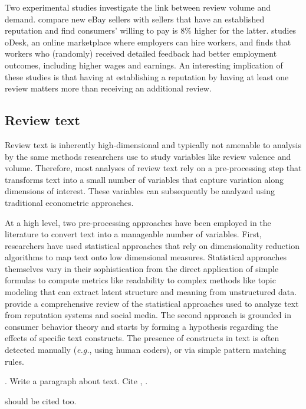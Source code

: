 \documentclass[letter,12pt]{article}
\begin{document}
Two experimental studies investigate the link between review volume and
demand. \citet{resnick2006value} compare new eBay sellers with sellers that
have an established reputation and find consumers' willing to pay is 8\%
higher for the latter. \citet{pallais2014inefficient} studies oDesk, an online
marketplace where employers can hire workers, and finds that workers who
(randomly) received detailed feedback had better employment outcomes,
including higher wages and earnings. An interesting implication of these
studies is that having at establishing a reputation by having at least one
review matters more than receiving an additional review.

\subsection{Review text}

Review text is inherently high-dimensional and typically not amenable to
analysis by the same methods researchers use to study variables like review
valence and volume. Therefore, most analyses of review text rely on a
pre-processing step that transforms text into a small number of variables that
capture variation along dimensions of interest. These variables can
subsequently be analyzed using traditional econometric approaches.

At a high level, two pre-processing approaches have been employed in the
literature to convert text into a manageable number of variables. First,
researchers have used statistical approaches that rely on dimensionality
reduction algorithms to map text onto low dimensional measures. Statistical
approaches themselves vary in their sophistication from the direct application
of simple formulas to compute metrics like readability to complex methods like
topic modeling that can extract latent structure and meaning from unstructured
data. \citet{moe2017social} provide a comprehensive review of the statistical
approaches used to analyze text from reputation systems and social media. The
second approach is grounded in consumer behavior theory and starts by forming
a hypothesis regarding the effects of specific text constructs. The presence
of constructs in text is often detected manually (\emph{e.g.}, using human
coders), or via simple pattern matching rules.

\citet{buschken2016sentence}.
Write a paragraph about text. Cite \citet{ghose2012designing},
\citet{packard2017language}.

\citet{ghose2011estimating} should be cited too.
\end{document}
